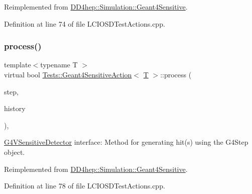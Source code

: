 Reimplemented from \hyperlink{class_d_d4hep_1_1_simulation_1_1_geant4_sensitive_abcce05101539a9941c06aada4625a608}{D\+D4hep\+::\+Simulation\+::\+Geant4\+Sensitive}.



Definition at line 74 of file L\+C\+I\+O\+S\+D\+Test\+Actions.\+cpp.

\hypertarget{class_tests_1_1_geant4_sensitive_action_a6ae919f9aeb71219a38300d3918ed814}{}\label{class_tests_1_1_geant4_sensitive_action_a6ae919f9aeb71219a38300d3918ed814} 
\subsubsection{\texorpdfstring{process()}{process()}\hspace{0.1cm}{\footnotesize\ttfamily [1/2]}}
{\footnotesize\ttfamily template$<$typename T $>$ \\
virtual bool \hyperlink{class_tests_1_1_geant4_sensitive_action}{Tests\+::\+Geant4\+Sensitive\+Action}$<$ \hyperlink{class_t}{T} $>$\+::process (\begin{DoxyParamCaption}\item[{G4\+Step $\ast$}]{step,  }\item[{G4\+Touchable\+History $\ast$}]{history }\end{DoxyParamCaption})\hspace{0.3cm}{\ttfamily [inline]}, {\ttfamily [virtual]}}



\hyperlink{class_g4_v_sensitive_detector}{G4\+V\+Sensitive\+Detector} interface\+: Method for generating hit(s) using the G4\+Step object. 



Reimplemented from \hyperlink{class_d_d4hep_1_1_simulation_1_1_geant4_sensitive_a9a9463a6c29a66dad43a52ffc9f7838d}{D\+D4hep\+::\+Simulation\+::\+Geant4\+Sensitive}.



Definition at line 78 of file L\+C\+I\+O\+S\+D\+Test\+Actions.\+cpp.

\hypertarget{class_tests_1_1_geant4_sensitive_action_aff7223d28e073cbcb4e2347f9514ba75}{}\label{class_tests_1_1_geant4_sensitive_action_aff7223d28e073cbcb4e2347f9514ba75} 
